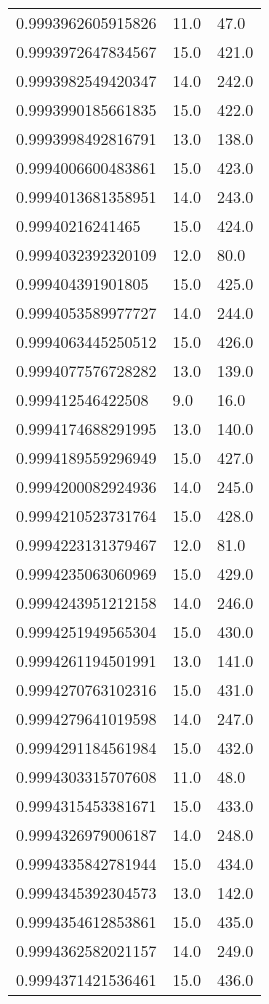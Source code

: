\begin{center}
\begin{supertabular}[H]{p{0.30\textwidth}p{0.05\textwidth}p{0.05\textwidth}}
0.9993962605915826 & 11.0 & 47.0 \\ 
0.9993972647834567 & 15.0 & 421.0 \\ 
0.9993982549420347 & 14.0 & 242.0 \\ 
0.9993990185661835 & 15.0 & 422.0 \\ 
0.9993998492816791 & 13.0 & 138.0 \\ 
0.9994006600483861 & 15.0 & 423.0 \\ 
0.9994013681358951 & 14.0 & 243.0 \\ 
0.99940216241465 & 15.0 & 424.0 \\ 
0.9994032392320109 & 12.0 & 80.0 \\ 
0.999404391901805 & 15.0 & 425.0 \\ 
0.9994053589977727 & 14.0 & 244.0 \\ 
0.9994063445250512 & 15.0 & 426.0 \\ 
0.9994077576728282 & 13.0 & 139.0 \\ 
0.999412546422508 & 9.0 & 16.0 \\ 
0.9994174688291995 & 13.0 & 140.0 \\ 
0.9994189559296949 & 15.0 & 427.0 \\ 
0.9994200082924936 & 14.0 & 245.0 \\ 
0.9994210523731764 & 15.0 & 428.0 \\ 
0.9994223131379467 & 12.0 & 81.0 \\ 
0.9994235063060969 & 15.0 & 429.0 \\ 
0.9994243951212158 & 14.0 & 246.0 \\ 
0.9994251949565304 & 15.0 & 430.0 \\ 
0.9994261194501991 & 13.0 & 141.0 \\ 
0.9994270763102316 & 15.0 & 431.0 \\ 
0.9994279641019598 & 14.0 & 247.0 \\ 
0.9994291184561984 & 15.0 & 432.0 \\ 
0.9994303315707608 & 11.0 & 48.0 \\ 
0.9994315453381671 & 15.0 & 433.0 \\ 
0.9994326979006187 & 14.0 & 248.0 \\ 
0.9994335842781944 & 15.0 & 434.0 \\ 
0.9994345392304573 & 13.0 & 142.0 \\ 
0.9994354612853861 & 15.0 & 435.0 \\ 
0.9994362582021157 & 14.0 & 249.0 \\ 
0.9994371421536461 & 15.0 & 436.0 \\ 

\end{supertabular}
\end{center}
